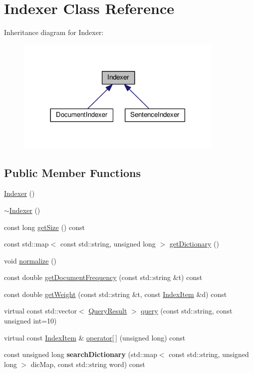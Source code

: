 \hypertarget{classIndexer}{}\section{Indexer Class Reference}
\label{classIndexer}


Inheritance diagram for Indexer\+:\nopagebreak
\begin{figure}[H]
\begin{center}
\leavevmode
\includegraphics[width=282pt]{classIndexer__inherit__graph}
\end{center}
\end{figure}
\subsection*{Public Member Functions}
\begin{DoxyCompactItemize}
\item 
\hyperlink{classIndexer_ac4c8c21c68d62185ceddbad8781e3b67}{Indexer} ()
\item 
\hyperlink{classIndexer_aaf5971639a7a2e3d9af4d8da62deb6f4}{$\sim$\+Indexer} ()
\item 
const long \hyperlink{classIndexer_af8decd4e68c48e73adec4cd5ed060dc9}{get\+Size} () const
\item 
const std\+::map$<$ const std\+::string, unsigned long $>$ \hyperlink{classIndexer_a92be0b09f21160df9e927d76dfbe48d1}{get\+Dictionary} ()
\item 
void \hyperlink{classIndexer_ae090be1899c4ce1e4baeb0acfe12cdee}{normalize} ()
\item 
const double \hyperlink{classIndexer_a23203a94532e8ba0054c1c282b666b94}{get\+Document\+Frequency} (const std\+::string \&t) const
\item 
const double \hyperlink{classIndexer_afae44a5845c0b2f29bd9951894eec941}{get\+Weight} (const std\+::string \&t, const \hyperlink{classIndexItem}{Index\+Item} \&d) const
\item 
virtual const std\+::vector$<$ \hyperlink{classQueryResult}{Query\+Result} $>$ \hyperlink{classIndexer_abd1dd6a6da0c9e43efaa99866c538e6c}{query} (const std\+::string, const unsigned int=10)
\item 
virtual const \hyperlink{classIndexItem}{Index\+Item} \& \hyperlink{classIndexer_ac9a2012415a2b06251852047e30bf618}{operator\mbox{[}$\,$\mbox{]}} (unsigned long) const
\item 
\mbox{\label{classIndexer_af7e039dbdd74e84036b37510bf621f2b}} 
const unsigned long {\bfseries search\+Dictionary} (std\+::map$<$ const std\+::string, unsigned long $>$ dic\+Map, const std\+::string word) const
\end{DoxyCompactItemize}
